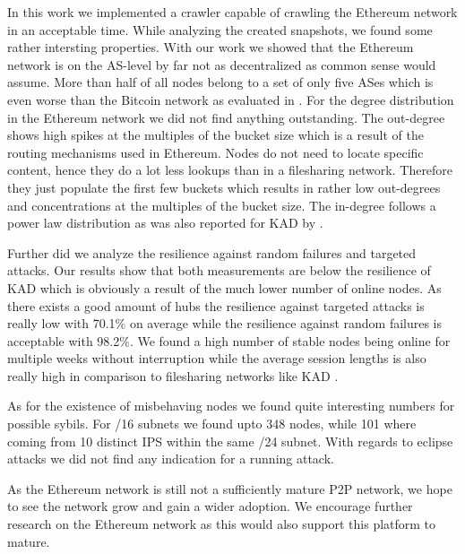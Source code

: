 \documentclass[10pt,conference,final]{IEEEtran}
\begin{document}
In this work we implemented a crawler capable of crawling the Ethereum network in an acceptable time.
While analyzing the created snapshots, we found some rather intersting properties.
With our work we showed that the Ethereum network is on the AS-level by far not as decentralized as common sense would assume.
More than half of all nodes belong to a set of only five ASes which is even worse than the Bitcoin network as evaluated in \cite{35}.
For the degree distribution in the Ethereum network we did not find anything outstanding.
The out-degree shows high spikes at the multiples of the bucket size which is a result of the routing mechanisms used in Ethereum.
Nodes do not need to locate specific content, hence they do a lot less lookups than in a filesharing network.
Therefore they just populate the first few buckets which results in rather low out-degrees and concentrations at the multiples of the bucket size.
The in-degree follows a power law distribution as was also reported for KAD by \cite{18}.

Further did we analyze the resilience against random failures and targeted attacks.
Our results show that both measurements are below the resilience of KAD \cite{18} which is obviously a result of the much lower number of online nodes.
As there exists a good amount of hubs the resilience against targeted attacks is really low with 70.1\% on average while the resilience against random failures is acceptable with 98.2\%.
We found a high number of stable nodes being online for multiple weeks without interruption while the average session lengths is also really high in comparison to filesharing networks like KAD \cite{23}.

As for the existence of misbehaving nodes we found quite interesting numbers for possible sybils.
For /16 subnets we found upto 348 nodes, while 101 where coming from 10 distinct IPS within the same /24 subnet.
With regards to eclipse attacks we did not find any indication for a running attack.

As the Ethereum network is still not a sufficiently mature P2P network, we hope to see the network grow and gain a wider adoption.
We encourage further research on the Ethereum network as this would also support this platform to mature.
\end{document}
